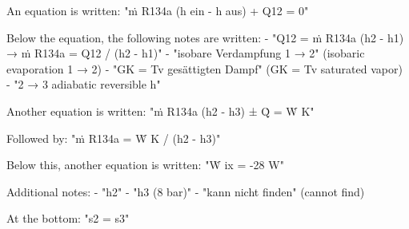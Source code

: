 An equation is written:  
"ṁ R134a (h ein - h aus) + Q12 = 0"  

Below the equation, the following notes are written:  
- "Q12 = ṁ R134a (h2 - h1) → ṁ R134a = Q12 / (h2 - h1)"  
- "isobare Verdampfung 1 → 2" (isobaric evaporation 1 → 2)  
- "GK = Tv gesättigten Dampf" (GK = Tv saturated vapor)  
- "2 → 3 adiabatic reversible h"  

Another equation is written:  
"ṁ R134a (h2 - h3) ± Q̇ = Ẇ K"  

Followed by:  
"ṁ R134a = Ẇ K / (h2 - h3)"  

Below this, another equation is written:  
"Ẇ ix = -28 W"  

Additional notes:  
- "h2"  
- "h3 (8 bar)"  
- "kann nicht finden" (cannot find)  

At the bottom:  
"s2 = s3"